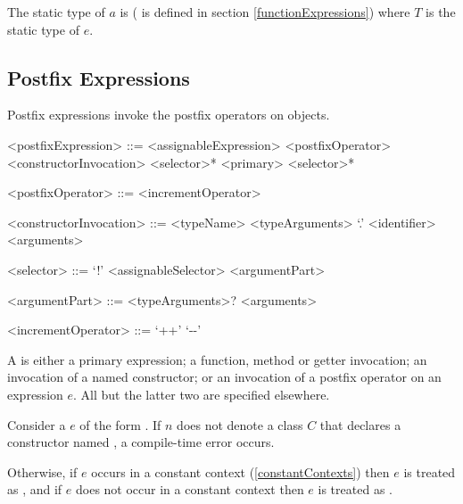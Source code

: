 \documentclass[makeidx]{article}
\begin{document}
{


\LMHash{}%
The static type of $a$ is  (\flatten{} is defined in section \ref{functionExpressions}) where $T$ is the static type of $e$.


\subsection{Postfix Expressions}

\LMHash{}%
Postfix expressions invoke the postfix operators on objects.

\begin{grammar}
<postfixExpression> ::= <assignableExpression> <postfixOperator>
  \alt <constructorInvocation> <selector>*
  \alt <primary> <selector>*

<postfixOperator> ::= <incrementOperator>

<constructorInvocation> ::= \gnewline{}
  <typeName> <typeArguments> `.' <identifier> <arguments>

<selector> ::= `!'
  \alt <assignableSelector>
  \alt <argumentPart>

<argumentPart> ::=
  <typeArguments>? <arguments>

<incrementOperator> ::= `++'
  \alt `-\mbox-'
\end{grammar}

\LMHash{}%
A  is either a primary expression;
a function, method or getter invocation;
an invocation of a named constructor;
or an invocation of a postfix operator on an expression $e$.
All but the latter two are specified elsewhere.

\LMHash{}%
Consider a  $e$ of the form
.
If $n$ does not denote a class $C$
that declares a constructor named ,
a compile-time error occurs.

\LMHash{}%
Otherwise, if $e$ occurs in a constant context
(\ref{constantContexts})
then $e$ is treated as ,
and if $e$ does not occur in a constant context
then $e$ is treated as .

}
\end{document}
